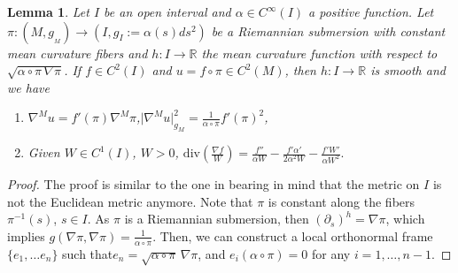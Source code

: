 \documentclass[12pt]{article}
\newcommand{\MA}[1]{\textcolor{marieamelie}{#1}}
\newcommand{\Miguel}[1]{\textcolor{miguel}{#1}}
\newtheorem{lemma}{Lemma}
\numberwithin{lemma}{section}
\newcommand{\R}{\mathbb{R}}
\newcommand{\ep}{\varepsilon}
\newcommand{\grad}{\nabla}
\begin{document}
{\begin{lemma} \label{lemilla}
Let $I$ be an open interval and $\alpha\in C^{\infty}(I)$ a positive function. Let $\pi:(M,g_{_M})\rightarrow(I,g_I:=\alpha(s)ds^2)$ be a Riemannian submersion with constant mean curvature fibers and $h:I\rightarrow\mathbb{R}$ the mean curvature function with respect to $\sqrt{\alpha\circ\pi\,\grad\pi}$.  If $f\in C^2(I)$ and $u=f\circ\pi\in C^2(M)$, then $h:I\rightarrow\R$ is smooth and we have
\begin{enumerate}
\item $\grad^M u = f'(\pi)\grad^M \pi$,\quad $\vert \grad^M u\vert_{g_M}^2=  \frac{1}{\alpha\circ\pi} f'(\pi)^2$,
\item Given $W\in C^1(I)$, $W>0$, 
$\mathrm{div}\left(\frac{\nabla f}{W}\right)=\frac{f''}{\alpha W} - \frac{f'\alpha'}{2 \alpha^2 W} - \frac{f'W'}{\alpha W^2}.$
\end{enumerate}
\end{lemma}
\begin{proof}
The proof is similar to the one in \cite{LO} bearing in mind that the metric on $I$ is not the Euclidean metric anymore. Note that $\pi$ is constant along the fibers $\pi^{-1}(s)$, $s\in I$. As $\pi$ is a Riemannian submersion, then $(\partial_s)^h=\grad\pi$, which implies $g(\nabla\pi,\nabla\pi)=\frac{1}{\alpha\circ\pi}$. Then, we can construct a local orthonormal frame $\{e_1,\dots e_n\}$ such that$e_n=\sqrt{\alpha\circ\pi}\,\nabla\pi$,  and $e_i(\alpha\circ\pi)=0$ for any $i=1,\ldots,n-1$. 

\end{proof}}
\end{document}
